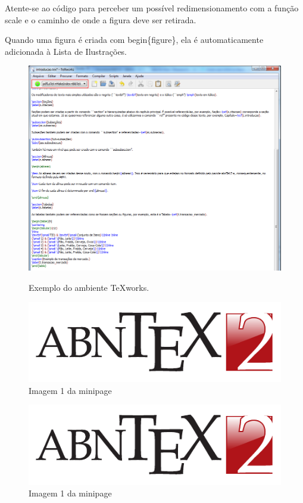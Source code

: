 Atente-se ao código para perceber um possível redimensionamento com a função scale e o caminho de onde a figura deve ser retirada.

Quando uma figura é criada com begin\{figure\}, ela é automaticamente adicionada à Lista de Ilustrações.

\begin{figure}[htbp]
\caption{\small Exemplo do ambiente TeXworks.}
\centering
\includegraphics[scale=0.50]{figs/tex_exemplo.png}
\label{f.disposicao_mercado}
\end{figure}

\begin{figure}[htbp]
    \centering
    \caption{Imagem 1 da minipage} \label{fig_minipage_imagem1}
    \includegraphics[scale=0.9]{figs/abntex2-modelo-img-marca.pdf}
\end{figure}

\begin{figure}[htbp]
    \centering
    \caption{Imagem 1 da minipage} \label{1}
    \includegraphics[scale=0.9]{figs/abntex2-modelo-img-marca.pdf}
\end{figure}

